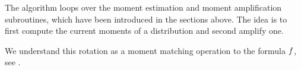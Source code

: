 The algorithm loops over the moment estimation and moment amplification subroutines, which have been introduced in the sections above.
The idea is to first compute the current moments of a distribution and second amplify one.




We understand this rotation as a moment matching operation to the formula $f$, see .


